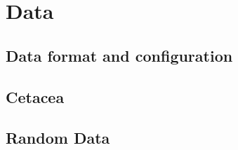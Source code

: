 \section{Data}\label{sec:data}
\subsection{Data format and configuration}\label{subsec:data_format}
\subsection{Cetacea}\label{subsec:cetacea}
\subsection{Random Data}\label{subsec:random_data}
